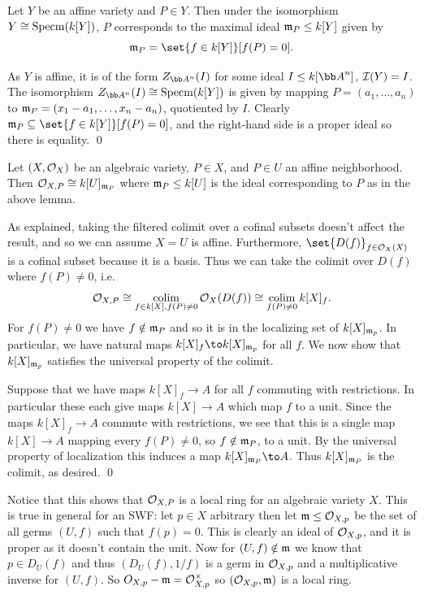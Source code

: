 \blemm

    Let $Y$ be an affine variety and $P\in Y$.
    Then under the isomorphism $Y\cong{\rm Specm}(k[Y])$, $P$ corresponds to the maximal ideal ${{\frak m}}_P\leq k[Y]$ given by
    $$ \m_P = \set{f\in k[Y]}[f(P)=0] . $$

\elemm

\bproof

    As $Y$ is affine, it is of the form $Z_{\bA^n}(I)$ for some ideal $I\leq k[\bA^n]$, ${{\cal I}}(Y)=I$.
    The isomorphism $Z_{\bA^n}(I)\cong\specm(k[Y])$ is given by mapping $P=(a_1,\dots,a_n)$ to ${{\frak m}}_P=(x_1-a_1,\dots,x_n-a_n)$, quotiented by $I$.
    Clearly $\m_P\subseteq\set{f\in k[Y]}[f(P)=0]$, and the right-hand side is a proper ideal so there is equality.
    \qed

\eproof

\bcoro

    Let $(X,{{\cal O}}_X)$ be an algebraic variety, $P\in X$, and $P\in U$ an affine neighborhood.
    Then ${{\cal O}}_{X,P}\cong k[U]_{{{\frak m}}_P}$ where ${{\frak m}}_P\leq k[U]$ is the ideal corresponding to $P$ as in the above lemma.

\ecoro

\bproof

    As explained, taking the filtered colimit over a cofinal subsets doesn't affect the result, and so we can assume $X=U$ is affine.
    Furthermore, $\set{D(f)}_{f\in\O_X(X)}$ is a cofinal subset because it is a basis.
    Thus we can take the colimit over $D(f)$ where $f(P)\neq0$, i.e.
    $$ {{\cal O}}_{X,P} \cong \mathop{\rm colim}\limits_{f\in k[X],f(P)\neq0}{{\cal O}}_X(D(f)) \cong \mathop{\rm colim}\limits_{f(P)\neq0}k[X]_f . $$
    For $f(P)\neq0$ we have $f\notin{{\frak m}}_P$ and so it is in the localizing set of $k[X]_{{{\frak m}}_p}$.
    In particular, we have natural maps $k[X]_f\to k[X]_{\m_p}$ for all $f$.
    We now show that $k[X]_{{{\frak m}}_p}$ satisfies the universal property of the colimit.

    Suppose that we have maps $k[X]_f\to A$ for all $f$ commuting with restrictions.
    In particular these each give maps $k[X]\to A$ which map $f$ to a unit.
    Since the maps $k[X]_f\to A$ commute with restrictions, we see that this is a single map $k[X]\to A$ mapping every $f(P)\neq0$, so $f\notin{{\frak m}}_P$, to a unit.
    By the universal property of localization this induces a map $k[X]_{\m_P}\to A$.
    Thus $k[X]_{{{\frak m}}_P}$ is the colimit, as desired.
    \qed

\eproof

\bnote

    Notice that this shows that ${{\cal O}}_{X,P}$ is a local ring for an algebraic variety $X$.
    This is true in general for an SWF: let $p\in X$ arbitrary then let ${{\frak m}}\leq{{\cal O}}_{X,p}$ be the set of all germs $(U,f)$ such that $f(p)=0$.
    This is clearly an ideal of ${{\cal O}}_{X,p}$, and it is proper as it doesn't contain the unit.
    Now for $(U,f)\notin{{\frak m}}$ we know that $p\in D_U(f)$ and thus $(D_U(f),1/f)$ is a germ in ${{\cal O}}_{X,p}$ and a multiplicative inverse for $(U,f)$.
    So $O_{X,p}-{{\frak m}}={{\cal O}}_{X,p}^\times$ so $({{\cal O}}_{X,p},{{\frak m}})$ is a local ring.

